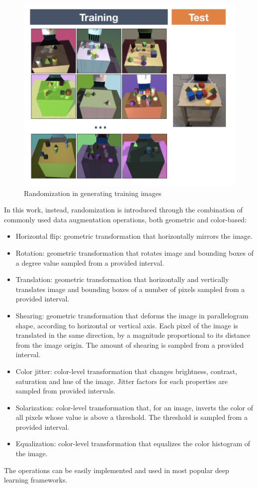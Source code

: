 \documentclass[%
    corpo=12pt,
    twoside,
    stile=classica,   
    tipotesi=magistrale,
    evenboxes,
    english
]{toptesi}
\begin{document}
\begin{figure}[ht!]
	\centering
	\includegraphics[width=0.6\linewidth]{imgs/randomization.png}
	\caption{Randomization in generating training images\cite{tobin2017domain}}
	\label{fig:randomization}
\end{figure}

In this work, instead, randomization is introduced through the combination of commonly used data augmentation operations, both geometric and color-based:
\begin{itemize}
	\item Horizontal flip: geometric transformation that horizontally mirrors the image.
	\item Rotation: geometric transformation that rotates image and bounding boxes of a degree value sampled from a provided interval.
	\item Translation: geometric transformation that horizontally and vertically translates image and bounding boxes of a number of pixels sampled from a provided interval.
	\item Shearing: geometric transformation that deforms the image in parallelogram shape, according to horizontal or vertical axis. Each pixel of the image is translated in the same direction, by a magnitude proportional to its distance from the image origin. The amount of shearing is sampled from a provided interval.
	\item Color jitter: color-level transformation that changes brightness, contrast, saturation and hue of the image. Jitter factors for each properties are sampled from provided intervals.
	\item Solarization: color-level transformation that, for an image, inverts the color of all pixels whose value is above a threshold. The threshold is sampled from a provided interval.
	\item Equalization: color-level transformation that equalizes the color histogram of the image.
\end{itemize}
The operations can be easily implemented and used in most popular deep learning frameworks.
\end{document}
